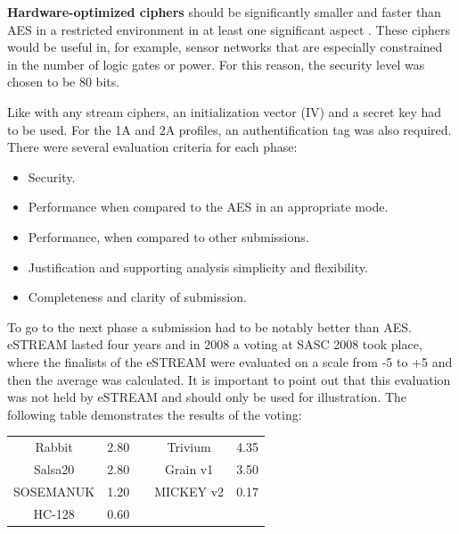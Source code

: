 	\textbf{Hardware-optimized ciphers} should be significantly smaller and faster  than AES in a restricted environment in at least one significant aspect \cite{good2008asic}. These ciphers would be useful in, for example, sensor networks that are especially constrained in the number of logic gates or power. For this reason, the security level was chosen to be 80 bits.
	
	Like with any stream ciphers, an initialization vector (IV) and a secret key had to be used. For the 1A and 2A profiles, an authentification tag was also required.\\
	There were several evaluation criteria for each phase:
	\begin{itemize}
		\setlength\itemsep{0.1em}
		\item Security.
		\item Performance when compared to the AES in an appropriate mode.
		\item Performance, when compared to other submissions.
		\item Justification and supporting analysis simplicity and flexibility.
		\item Completeness and clarity of submission.
	\end{itemize}
	
	To go to the next phase a submission had to be notably better than AES.\\
	eSTREAM lasted four years and in 2008 a voting at SASC 2008 took place, where the finalists of the eSTREAM were evaluated on a scale from -5 to +5 and then the average was calculated. It is important to point out that this evaluation was not held by eSTREAM and should only be used for illustration. The following table demonstrates the results of the voting:
	\begin{table}[h!]
		\centering
		\begin{tabular}{|c c |c| c c|} 
			\hline 
			Rabbit & 2.80 & & Trivium & 4.35\\ 
			Salsa20 & 2.80 & & Grain v1 & 3.50\\
			SOSEMANUK & 1.20 & & MICKEY v2& 0.17\\
			HC-128 & 0.60 & & & \\[1ex]
			\hline
		\end{tabular}
		\label{table:eStream portfolio with SASC2008 evaluation}
	\end{table}
	
